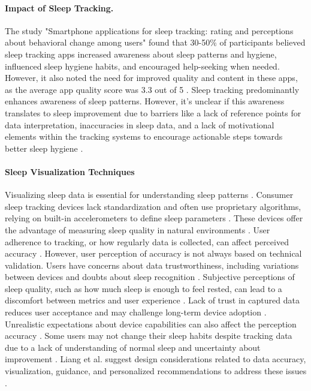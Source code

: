 \documentclass[
  a4paper,  %
  twoside,  %
  bibliography=totoc,
  headsepline,
  cleardoublepage=empty,
  parskip=half,
  draft=false
]{scrbook}
\begin{document}
\paragraph{Impact of Sleep Tracking.}

The study "Smartphone applications for sleep tracking: rating and perceptions about behavioral change among users" found that 30-50\% of participants believed sleep tracking apps increased awareness about sleep patterns and hygiene, influenced sleep hygiene habits, and encouraged help-seeking when needed. However, it also noted the need for improved quality and content in these apps, as the average app quality score was 3.3 out of 5 \cite{karasneh_smartphone_2022}. Sleep tracking predominantly enhances awareness of sleep patterns. However, it's unclear if this awareness translates to sleep improvement due to barriers like a lack of reference points for data interpretation, inaccuracies in sleep data, and a lack of motivational elements within the tracking systems to encourage actionable steps towards better sleep hygiene \cite{SleepTracking_in_the_real_world}.

\paragraph{Sleep Visualization Techniques}
Visualizing sleep data is essential for understanding sleep patterns . Consumer sleep tracking devices lack standardization and often use proprietary algorithms, relying on built-in accelerometers to define sleep parameters \cite{SleepTracking_ClnicalCare, lee_consumer_review2015}. These devices offer the advantage of measuring sleep quality in natural environments \cite{Making_sense_of_sensors}. User adherence to tracking, or how regularly data is collected, can affect perceived accuracy \cite{Defining_Adherence}. However, user perception of accuracy is not always based on technical validation.
Users have concerns about data trustworthiness, including variations between devices and doubts about sleep recognition \cite{Challenges_Oppotunieties_SleepTracking}. Subjective perceptions of sleep quality, such as how much sleep is enough to feel rested, can lead to a discomfort between metrics and user experience \cite{sleepexplorer}. Lack of trust in captured data reduces user acceptance \cite{Trust_activity_tracker} and may challenge long-term device adoption \cite{sleepexplorer}. Unrealistic expectations about device capabilities can also affect the perception accuracy \cite{Use_and_Adoption}.
Some users may not change their sleep habits despite tracking data due to a lack of understanding of normal sleep and uncertainty about improvement \cite{SleepTracking_in_the_real_world}. Liang et al. suggest design considerations related to data accuracy, visualization, guidance, and personalized recommendations to address these issues \cite{SleepTracking_in_the_real_world}.
\end{document}
